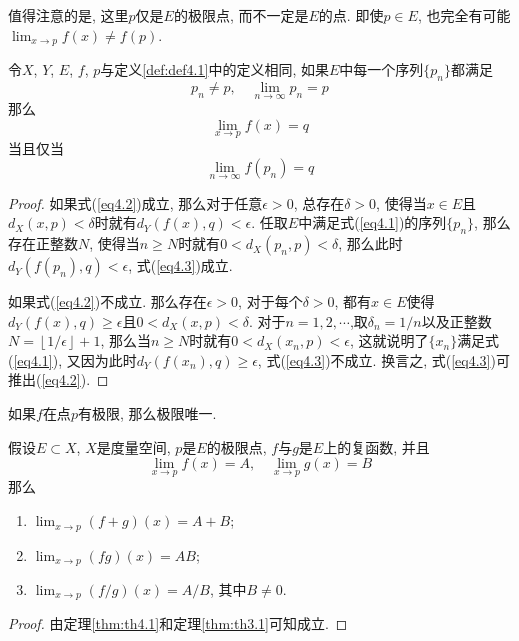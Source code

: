 \documentclass[cn,12pt,math=mtpro2,citestyle=gb7714-2015,bibstyle=gb7714-2015,twocol]{elegantbook}
\newcommand{\limn}{\lim_{n\to\infty}}
\begin{document}
值得注意的是, 这里$p$仅是$E$的极限点, 而不一定是$E$的点. 即使$p\in E$, 也完全有可能$\lim_{x\to p}f(x)\neq f(p)$.
\begin{theorem}\label{thm:th4.1}
  令$X$, $Y$, $E$, $f$, $p$与定义\ref{def:def4.1}中的定义相同, 如果$E$中每一个序列$\{p_n\}$都满足
  \begin{equation}\label{eq4.1}
    p_n\neq p,\quad \limn p_n=p
  \end{equation}
  那么
  \begin{equation}\label{eq4.2}
    \displaystyle \lim_{x\to p}f(x)=q
  \end{equation}
  当且仅当
  \begin{equation}\label{eq4.3}
    \displaystyle\limn f(p_n)=q
  \end{equation}
\end{theorem}
\begin{proof}
  如果式(\ref{eq4.2})成立, 那么对于任意$\epsilon>0$, 总存在$\delta>0$, 使得当$x\in E$且$d_X(x,p)<\delta$时就有$d_Y(f(x),q)<\epsilon$. 任取$E$中满足式(\ref{eq4.1})的序列$\{p_n\}$, 那么存在正整数$N$, 使得当$n\geq N$时就有$0<d_X(p_n,p)<\delta$, 那么此时$d_Y(f(p_n),q)<\epsilon$, 式(\ref{eq4.3})成立.

  如果式(\ref{eq4.2})不成立. 那么存在$\epsilon>0$, 对于每个$\delta>0$, 都有$x\in E$使得$d_Y(f(x),q)\geq\epsilon$且$0<d_X(x,p)<\delta$. 对于$n=1,2,\cdots$,取$\displaystyle\delta_n=1/n$以及正整数$N=\displaystyle\left\lfloor1/\epsilon\right\rfloor+1$, 那么当$n\geq N$时就有$0<d_X(x_n,p)<\epsilon$, 这就说明了$\{x_n\}$满足式(\ref{eq4.1}), 又因为此时$d_Y(f(x_n),q)\geq\epsilon$, 式(\ref{eq4.3})不成立. 换言之, 式(\ref{eq4.3})可推出(\ref{eq4.2}).

\end{proof}
\begin{corollary}
如果$f$在点$p$有极限, 那么极限唯一.
\end{corollary}
\begin{theorem}\label{thm:th4.3}
  假设$E\subset X$, $X$是度量空间, $p$是$E$的极限点, $f$与$g$是$E$上的复函数, 并且
  $$\lim_{x\to p}f(x)=A,\quad\lim_{x\to p}g(x)=B$$
  那么
  \begin{enumerate}[label=(\arabic*)]
  \item $\lim_{x\to p}(f+g)(x)=A+B$;

  \item $\lim_{x\to p}(fg)(x)=AB$;

  \item $\lim_{x\to p}(f/g)(x)=A/B$, 其中$B\neq 0$.
  \end{enumerate}
\end{theorem}
\begin{proof}
  由定理\ref{thm:th4.1}和定理\ref{thm:th3.1}可知成立.
\end{proof}
\end{document}
